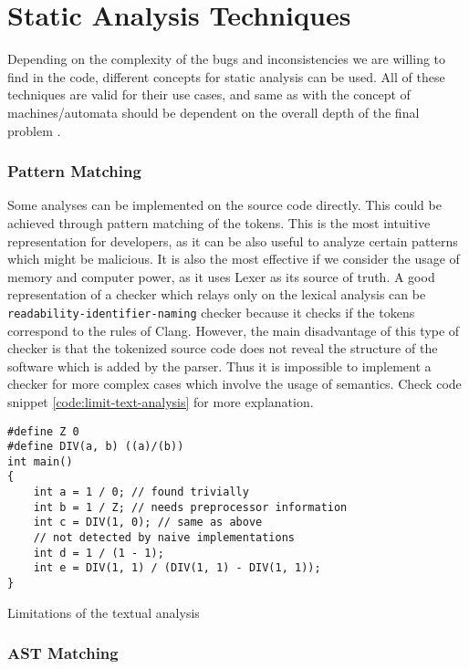 \section{Static Analysis Techniques}

Depending on the complexity of the bugs and inconsistencies we are willing to find in the code, different concepts for static analysis can be used. All of these techniques are valid for their use cases, and same as with the concept of machines/automata should be dependent on the overall depth of the final problem \cite{analysis-techniques}. 

\subsubsection{Pattern Matching} 

Some analyses can be implemented on the source code directly. This could be achieved through pattern matching of the tokens. This is the most intuitive representation for developers, as it can be also useful to analyze certain patterns which might be malicious. It is also the most effective if we consider the usage of memory and computer power, as it uses Lexer as its source of truth. A good representation of a checker which relays only on the lexical analysis can be \lstinline{readability-identifier-naming} checker because it checks if the tokens correspond to the rules of Clang. However, the main disadvantage of this type of checker is that the tokenized source code does not reveal the structure of the software which is added by the parser. Thus it is impossible to implement a checker for more complex cases which involve the usage of semantics. Check code snippet \ref{code:limit-text-analysis} for more explanation.

\begin{listing}[H]
\begin{verbatim}
#define Z 0
#define DIV(a, b) ((a)/(b))
int main()
{
    int a = 1 / 0; // found trivially
    int b = 1 / Z; // needs preprocessor information
    int c = DIV(1, 0); // same as above
    // not detected by naive implementations
    int d = 1 / (1 - 1);
    int e = DIV(1, 1) / (DIV(1, 1) - DIV(1, 1));
}
\end{verbatim}
\caption{Limitations of the textual analysis}
\label{code:limit-text-analysis}
\end{listing}


\subsubsection{AST Matching}

